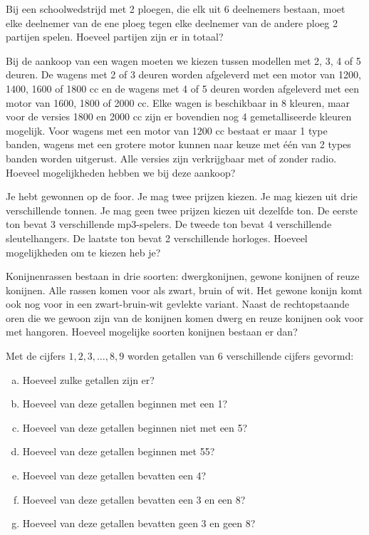 \documentclass[12pt,twoside]{article}
\begin{document}
\begin{oefening}
Bij een schoolwedstrijd met 2 ploegen, die elk uit 6 deelnemers bestaan, moet elke deelnemer van de ene ploeg tegen elke deelnemer van de andere ploeg 2 partijen spelen. Hoeveel partijen zijn er in totaal?
\end{oefening}

\begin{oefening}
Bij de aankoop van een wagen moeten we kiezen tussen modellen met 2, 3, 4 of 5 deuren. De wagens met 2 of 3 deuren worden afgeleverd met een motor van 1200, 1400, 1600 of 1800 cc en de wagens met 4 of 5 deuren worden afgeleverd met een motor van 1600, 1800 of 2000 cc. Elke wagen is beschikbaar in 8 kleuren, maar voor de versies 1800 en 2000 cc zijn er bovendien nog 4 gemetalliseerde kleuren mogelijk. Voor wagens met een motor van 1200 cc bestaat er maar 1 type banden, wagens met een grotere motor kunnen naar keuze met één van 2 types banden worden uitgerust. Alle versies zijn verkrijgbaar met of zonder radio. Hoeveel mogelijkheden hebben we bij deze aankoop?
\end{oefening}

\begin{oefening}
Je hebt gewonnen op de foor. Je mag twee prijzen kiezen. Je mag kiezen uit drie verschillende tonnen. Je mag geen twee prijzen kiezen uit dezelfde ton. De eerste ton bevat 3 verschillende mp3-spelers. De tweede ton bevat 4 verschillende sleutelhangers. De laatste ton bevat 2 verschillende horloges. Hoeveel mogelijkheden om te kiezen heb je?
\end{oefening}

\begin{oefening}
Konijnenrassen bestaan in drie soorten: dwergkonijnen, gewone konijnen of reuze konijnen. Alle rassen komen voor als zwart, bruin of wit. Het gewone konijn komt ook nog voor in een zwart-bruin-wit gevlekte variant. Naast de rechtopstaande oren die we gewoon zijn van de konijnen komen dwerg en reuze konijnen ook voor met hangoren. Hoeveel mogelijke soorten konijnen bestaan er dan?
\end{oefening}

\begin{oefening}
Met de cijfers $1, 2, 3, \ldots , 8, 9$ worden getallen van 6 verschillende cijfers gevormd:
\begin{enumerate}[(a)]
  \item Hoeveel zulke getallen zijn er?
  \item Hoeveel van deze getallen beginnen met een 1?
  \item Hoeveel van deze getallen beginnen niet met een 5?
  \item Hoeveel van deze getallen beginnen met 55?
  \item Hoeveel van deze getallen bevatten een 4?
  \item Hoeveel van deze getallen bevatten een 3 en een 8?
  \item Hoeveel van deze getallen bevatten geen 3 en geen 8?
\end{enumerate}
\end{oefening}
\end{document}
